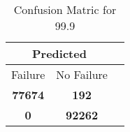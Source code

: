 \begin{table}[] 
\caption{Confusion Matric for 99.9} 
\label{Table: Prediction Accuracy-DMD99.9OnlySunEKF-ignoreReflectionEKF-top2perfectNoFailurePrediction-Reflection} 
\centering 
\begin{tabular} 
 {@{}ccc@{}} 
\toprule 
\multicolumn{2}{c}{\textbf{Predicted}}
 \\ \midrule 
\multicolumn{1}{|c|}{Failure} & 
\multicolumn{1}{c|}{No Failure}
 \\ \midrule 
\multicolumn{1}{|c|}{\color{green}\textbf{77674}} & 
\multicolumn{1}{c|}{\color{red}\textbf{192}}
 \\ \midrule 
\multicolumn{1}{|c|}{\color{red}\textbf{0}} & 
\multicolumn{1}{c|}{\color{green}\textbf{92262}}
 \\ \bottomrule 
\end{tabular} 
\end{table} 
